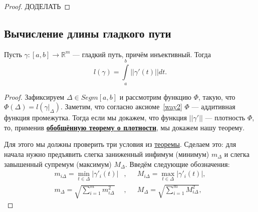 \begin{proof}
	ДОДЕЛАТЬ
\end{proof}

\subsection{Вычисление длины гладкого пути}

\begin{theorem}
	Пусть \(\gamma \colon [a, b] \to \mathbb{R}^m\) --- гладкий путь, причём инъективный. Тогда \[
	l(\gamma) = \int\limits_a^b ||\gamma'(t)|| dt.
	\]
\end{theorem}

\begin{proof}
	Зафиксируем \(\Delta \in Segm [a, b]\) и рассмотрим функцию \(\Phi\), такую, что \(\Phi(\Delta) = l(\gamma |_\Delta)\). Заметим, что согласно аксиоме~\ref{way2} \(\Phi\) --- аддитивная функция промежутка. Тогда если мы докажем, что функция \(||\gamma'||\) --- плотность \(\Phi\), то, применив \hyperlink{plotn}{\bfseries обобщённую теорему о плотности}, мы докажем нашу теорему.
	
	Для этого мы должны проверить три условия из \hyperlink{plotn}{теоремы}. Сделаем это: для начала нужно предъявить слегка заниженный инфимум (минимум) \(m_\Delta\) и слегка завышенный супремум (максимум) \(M_\Delta\). Введём следующие обозначения:
	\begin{align*}
		m_{i\Delta} = \min\limits_{t \in \Delta} |\gamma'_i (t)|&, &&M_{i\Delta} = \max\limits_{t \in \Delta} |\gamma'_i (t)|, \\
		m_\Delta = \sqrt{\sum\limits_{i = 1}^m m_{i\Delta}^2}&, &&M_\Delta = \sqrt{\sum\limits_{i = 1}^m M_{i\Delta}^2},
	\end{align*}
	

\end{proof}
